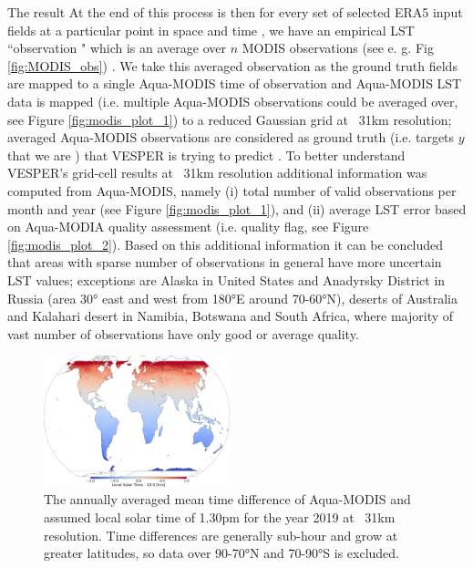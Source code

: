 \documentclass[hess, twostagejnl]{copernicus}
\providecommand{\DIFadd}[1]{{\protect\color{blue} \sf #1}} %
\providecommand{\DIFdel}[1]{{\protect\color{red} \scriptsize #1}} %
\providecommand{\DIFaddbegin}{} %
\providecommand{\DIFaddend}{} %
\providecommand{\DIFdelbegin}{} %
\providecommand{\DIFdelend}{} %
\providecommand{\DIFaddFL}[1]{\DIFadd{#1}} %
\begin{document}
\DIFdelbegin \DIFdel{The result }\DIFdelend \DIFaddbegin \DIFadd{At the end }\DIFaddend of this process \DIFdelbegin \DIFdel{is then for every set of }\DIFdelend \DIFaddbegin \DIFadd{selected }\DIFaddend ERA5 \DIFdelbegin \DIFdel{input fields at a particular point in space and time , we have an empirical LST ``observation " which is an average over $n$ MODIS observations (see e. g. Fig \ref{fig:MODIS_obs}) . We take this averaged observation as the ground truth }\DIFdelend \DIFaddbegin \DIFadd{fields are mapped to a single Aqua-MODIS time of observation and Aqua-MODIS LST data is mapped (i.e. multiple Aqua-MODIS observations could be averaged over, see Figure \ref{fig:modis_plot_1}) to a reduced Gaussian grid at ~31km resolution; averaged Aqua-MODIS observations are considered as ground truth (i.e. targets }\DIFaddend $y$\DIFdelbegin \DIFdel{that we are }\DIFdelend \DIFaddbegin \DIFadd{) that VESPER is }\DIFaddend trying to predict\DIFaddbegin \DIFadd{. To better understand VESPER’s grid-cell results at ~31km resolution additional information was computed from Aqua-MODIS, namely (i) total number of valid observations per month and year (see Figure \ref{fig:modis_plot_1}), and (ii) average LST error based on Aqua-MODIA quality assessment (i.e. quality flag, see Figure \ref{fig:modis_plot_2}). Based on this additional information it can be concluded that areas with sparse number of observations in general have more uncertain LST values; exceptions are Alaska in United States and Anadyrsky District in Russia (area 30° east and west from 180°E around 70-60°N), deserts of Australia and Kalahari desert in Namibia, Botswana and South Africa, where majority of vast number of observations have only good or average quality. }\newline 

\begin{figure}
	\includegraphics[width=0.48\textwidth]{MODIS_local_solar_time_diff}
	\caption{\DIFaddFL{The annually averaged mean time difference of Aqua-MODIS and assumed local solar time of 1.30pm for the year 2019 at ~31km resolution. Time differences are generally sub-hour and grow at greater latitudes, so data over 90-70°N and 70-90°S is excluded. }} 
	\label{fig:MODIS_time_error}
\end{figure}
\end{document}
